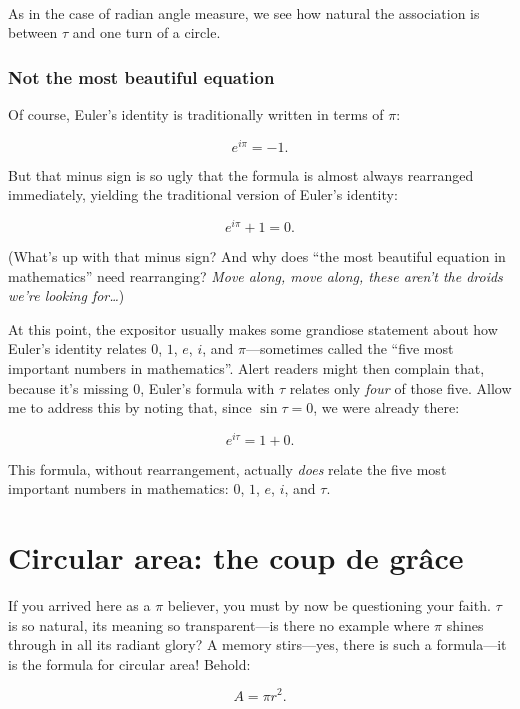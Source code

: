 \documentclass{article}
\begin{document}
\\

\noindent As in the case of radian angle measure, we see how natural the association is between $\tau$ and one turn of a circle.

    \subsubsection{Not the most beautiful equation} %

Of course, Euler's identity is traditionally written in terms of $\pi$:


\[ e^{i\pi} = -1. \]

\noindent But that minus sign is so ugly that the formula is almost always rearranged immediately, yielding the traditional version of Euler's identity:

\[ e^{i\pi} + 1 = 0. \]

\noindent (What's up with that minus sign? And why does ``the most beautiful equation in mathematics'' need rearranging? \emph{Move along, move along, these aren't the droids we're looking for\ldots})

At this point, the expositor usually makes some grandiose statement about how Euler's identity relates $0$, $1$, $e$, $i$, and $\pi$---sometimes called the ``five most important numbers in mathematics''. Alert readers might then complain that, because it's missing $0$, Euler's formula with $\tau$ relates only \emph{four} of those five. Allow me to address this by noting that, since $\sin\tau = 0$, we were already there:

\[ e^{i\tau} = 1 + 0. \]

\noindent This formula, without rearrangement, actually \emph{does} relate the five most important numbers in mathematics: $0$, $1$, $e$, $i$, and $\tau$.

\section{Circular area: the coup de gr\^{a}ce} %
\label{sec:circular_area}

If you arrived here as a $\pi$ believer, you must by now be questioning your faith. $\tau$ is so natural, its meaning so transparent---is there no example where $\pi$ shines through in all its radiant glory? A memory stirs---yes, there is such a formula---it is the formula for circular area! Behold:

\[ A = \pi r^2. \]
\end{document}
